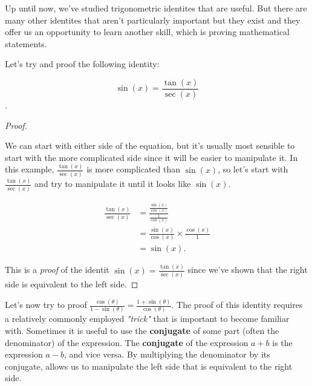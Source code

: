 
Up until now, we've studied trigonometric identites that are useful. But there
are many other identites that aren't particularly important but they exist and
they offer us an opportunity to learn another skill, which is proving
mathematical statements.

Let's try and proof the following identity:

\[ \sin (x) = \frac{\tan (x)}{\sec (x)} \].

\begin{proof}
  \label{prf:sin_equals_tan_over_sec}

  We can start with either side of the equation, but it's usually most
  sensible to start with the more complicated side since it will be easier to
  manipulate it. In this example, $\frac{\tan (x)}{\sec (x)}$ is more
  complicated than $\sin (x)$, so let's start with $\frac{\tan (x)}{\sec (x)}$ 
  and try to manipulate it until it looks like $\sin (x)$.

  \begin{align*}
    \frac{\tan (x)}{\sec (x)} &= \frac{\frac{\sin (x)}{\cos (x)}}{\frac{1}{\cos (x)}} \\
                              &= \frac{\sin (x)}{\cos (x)} \times \frac{\cos (x)}{1} \\
                              &= \sin (x)
  .\end{align*}

  This is a \textit{proof} of the identit $\sin (x) = \frac{\tan (x)}{\sec
  (x)}$ since we've shown that the right side is equivalent to the left side.
\end{proof}

Let's now try to proof $\frac{\cos (\theta)}{1 - \sin (\theta)} = \frac{1 +
\sin (\theta)}{\cos (\theta)}$. The proof of this identity requires a
relatively commonly employed \textit{"trick"} that is important to become
familiar with. Sometimes it is useful to use the \textbf{conjugate} of some
part (often the denominator) of the expression. The \textbf{conjugate} of the
expression $a + b$ is the expression $a - b$, and vice versa. By multiplying
the denominator by its conjugate, allows us to manipulate the left side that
is equivalent to the right side.

